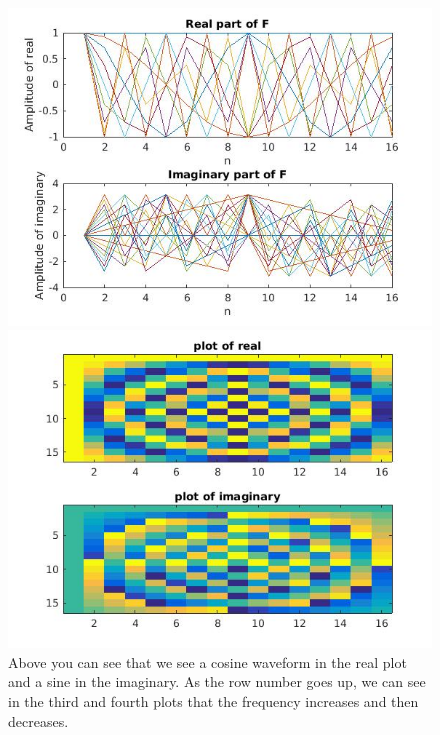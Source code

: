 \documentclass{article}
\begin{document}
\begin{figure}[H]
\includegraphics[scale =.4]{report4_1}
\includegraphics[scale =.4]{report4_2}
\\Above you can see that we see a cosine waveform in the real plot and a sine in the imaginary. As the row number goes up, we can see in the third and fourth plots that the frequency increases
 and then decreases.
\end{figure}
\end{document}
